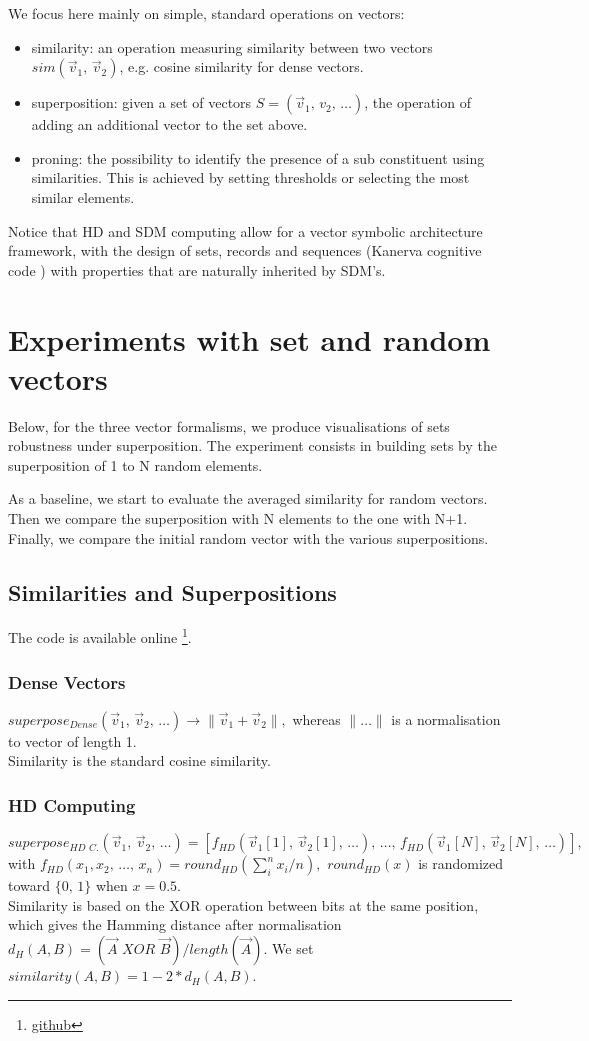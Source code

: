\documentclass[11pt]{article}
\begin{document}
We focus here mainly on simple, standard operations on vectors:
\begin{itemize}
\item similarity: an operation measuring similarity between two vectors $sim(\vec v_1,\, \vec v_2)$, e.g. cosine similarity for dense vectors.
\item superposition: given a set of vectors $S=(\vec v_1,\, v_2,\, \dots)$, the operation of adding an additional vector to the set above.
\item proning: the possibility to identify the presence of a sub constituent using similarities. This is achieved by setting thresholds or selecting the most similar elements.
\end{itemize}
Notice that HD and SDM computing allow for a vector symbolic architecture framework, with the design of sets, records and sequences (Kanerva cognitive code \cite{kanerva1}) with properties that are naturally inherited by SDM's.






\section{Experiments with set and random vectors}
Below, for the three vector formalisms, we  produce visualisations of sets robustness under superposition.
The experiment consists in building sets by the superposition of 1 to N random elements.

As a baseline, we start to evaluate the averaged similarity for random vectors.  Then we compare the superposition with N elements to the one with N+1. Finally, we compare the initial random vector with the various  superpositions.

\subsection{Similarities and Superpositions}
The code is available online \footnote{\url{github}}.
\subsubsection{Dense Vectors}
	$superpose_{Dense}(\vec v_1,\, \vec v_2, \, \dots) \to \| \vec v_1 + \vec v_2 \|,$
	whereas $\| \dots \|$ is a normalisation to vector of length 1. \\
	Similarity is the standard cosine similarity.
\subsubsection{HD Computing}
	$superpose_{HD\,\, C.}(\vec v_1,\, \vec v_2, \, \dots) = [ f_{HD}(\vec v_1[1], \, \vec v_2[1], \, \dots), \, \dots, \, f_{HD}(\vec v_1[N], \, \vec v_2[N], \, \dots)],$
	with $f_{HD}(x_1, x_2,\, \dots, \, x_n) = round_{HD}(\sum_i^n x_i/ n) ,$
	$round_{HD} (x)$ is randomized toward $\{0, \, 1 \}$ when $x=0.5$.\\
	Similarity is based on the XOR operation between bits at the same position, which gives the Hamming distance after normalisation $d_{H}(A, B) = (\vec A\,\, XOR\,\, \vec B) / length(\vec A)$.
	We set $similarity(A, B) = 1 - 2*d_H(A, B)$.
		
\end{document}
